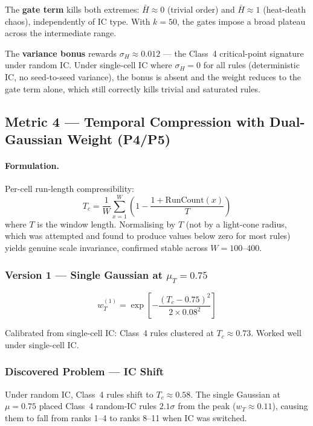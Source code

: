\documentclass[12pt,a4paper]{article}
\begin{document}
The \textbf{gate term} kills both extremes: $\bar{H} \approx 0$ (trivial order)
and $\bar{H} \approx 1$ (heat-death chaos), independently of IC type.
With $k = 50$, the gates impose a broad plateau across the intermediate range.

The \textbf{variance bonus} rewards $\sigma_H \approx 0.012$ --- the
Class~4 critical-point signature under random IC.
Under single-cell IC where $\sigma_H = 0$ for all rules (deterministic IC,
no seed-to-seed variance), the bonus is absent and the weight reduces to
the gate term alone, which still correctly kills trivial and saturated rules.

\subsection{Metric 4 --- Temporal Compression with Dual-Gaussian Weight (P4/P5)}

\paragraph{Formulation.}
Per-cell run-length compressibility:
\begin{equation}
T_c = \frac{1}{W}\sum_{x=1}^{W}\left(1 - \frac{1 + \text{RunCount}(x)}{T}\right)
\end{equation}
where $T$ is the window length.
Normalising by $T$ (not by a light-cone radius, which was attempted and
found to produce values below zero for most rules) yields genuine scale
invariance, confirmed stable across $W = 100$--$400$.

\subsubsection*{Version 1 --- Single Gaussian at $\mu_T = 0.75$}

\begin{equation}
w_T^{(1)} = \exp\!\left[-\frac{(T_c - 0.75)^2}{2 \times 0.08^2}\right]
\end{equation}

Calibrated from single-cell IC: Class~4 rules clustered at $T_c \approx 0.73$.
Worked well under single-cell IC.

\subsubsection*{Discovered Problem --- IC Shift}

Under random IC, Class~4 rules shift to $T_c \approx 0.58$.
The single Gaussian at $\mu = 0.75$ placed Class~4 random-IC rules $2.1\sigma$
from the peak ($w_T \approx 0.11$), causing them to fall from ranks 1--4 to
ranks 8--11 when IC was switched.
\end{document}
